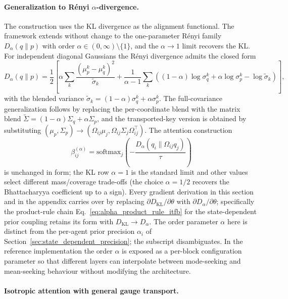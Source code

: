 \documentclass[11pt]{article}
\begin{document}
\paragraph{Generalization to R\'enyi $\alpha$-divergence.}
The construction uses the KL divergence as the alignment functional. The framework extends without change to the one-parameter R\'enyi family $D_\alpha(q \| p)$ with order $\alpha \in (0, \infty) \setminus \{1\}$, and the $\alpha \to 1$ limit recovers the KL. For independent diagonal Gaussians the R\'enyi divergence admits the closed form
\begin{equation}
D_\alpha(q \| p) = \frac{1}{2}\left[ \alpha \sum_k \frac{(\mu_p^k - \mu_q^k)^2}{\tilde\sigma_k} + \frac{1}{\alpha - 1} \sum_k \left((1-\alpha)\log \sigma_q^k + \alpha \log \sigma_p^k - \log \tilde\sigma_k\right) \right],
\label{eq:renyi_diagonal_itfb}
\end{equation}
with the blended variance $\tilde\sigma_k = (1-\alpha)\sigma_q^k + \alpha\sigma_p^k$. The full-covariance generalization follows by replacing the per-coordinate blend with the matrix blend $\tilde\Sigma = (1-\alpha)\Sigma_q + \alpha \Sigma_p$, and the transported-key version is obtained by substituting $(\mu_p, \Sigma_p) \to (\Omega_{ij}\mu_j, \Omega_{ij}\Sigma_j\Omega_{ij}^\top)$. The attention construction
\begin{equation}
\beta_{ij}^{(\alpha)} = \mathrm{softmax}_j\left(-\frac{D_\alpha(q_i \| \Omega_{ij} q_j)}{\tau}\right)
\label{eq:renyi_attention_itfb}
\end{equation}
is unchanged in form; the KL row $\alpha = 1$ is the standard limit and other values select different mass/coverage trade-offs (the choice $\alpha = 1/2$ recovers the Bhattacharyya coefficient up to a sign). Every gradient derivation in this section and in the appendix carries over by replacing $\partial D_{\mathrm{KL}}/\partial \theta$ with $\partial D_\alpha/\partial \theta$; specifically the product-rule chain Eq.~\eqref{eq:alpha_product_rule_itfb} for the state-dependent prior coupling retains its form with $D_{\mathrm{KL}} \to D_\alpha$. The order parameter $\alpha$ here is distinct from the per-agent prior precision $\alpha_i$ of Section~\ref{sec:state_dependent_precision}; the subscript disambiguates. In the reference implementation the order $\alpha$ is exposed as a per-block configuration parameter so that different layers can interpolate between mode-seeking and mean-seeking behaviour without modifying the architecture.

\paragraph{Isotropic attention with general gauge transport.}
\end{document}
